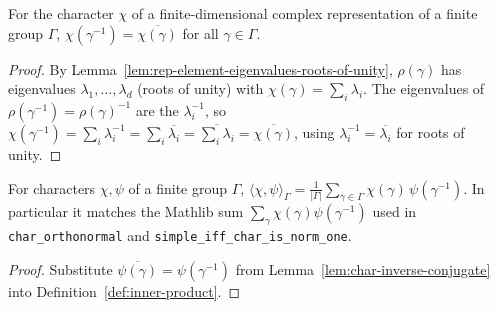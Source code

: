 \begin{lemma}
    \label{lem:char-inverse-conjugate}
    For the character $\chi$ of a finite-dimensional complex representation of a
    finite group $\Gamma$, $\chi(\gamma^{-1}) = \overline{\chi(\gamma)}$ for all
    $\gamma \in \Gamma$.
\end{lemma}
\begin{proof}
    By Lemma~\ref{lem:rep-element-eigenvalues-roots-of-unity},
    $\rho(\gamma)$ has eigenvalues $\lambda_1, \dots, \lambda_d$ (roots of unity)
    with $\chi(\gamma) = \sum_i \lambda_i$. The eigenvalues of
    $\rho(\gamma^{-1}) = \rho(\gamma)^{-1}$ are the $\lambda_i^{-1}$, so
    $\chi(\gamma^{-1}) = \sum_i \lambda_i^{-1} = \sum_i \overline{\lambda_i} =
    \overline{\sum_i \lambda_i} = \overline{\chi(\gamma)}$, using
    $\lambda_i^{-1} = \overline{\lambda_i}$ for roots of unity.
\end{proof}

\begin{lemma}
    \label{lem:inner-product-as-character-sum}
    For characters $\chi, \psi$ of a finite group $\Gamma$,
    $\langle \chi, \psi \rangle_\Gamma = \frac{1}{|\Gamma|}\sum_{\gamma \in
    \Gamma} \chi(\gamma)\,\psi(\gamma^{-1})$. In particular it matches the
    Mathlib sum $\sum_{\gamma} \chi(\gamma)\psi(\gamma^{-1})$ used in
    \texttt{char\_orthonormal} and \texttt{simple\_iff\_char\_is\_norm\_one}.
\end{lemma}
\begin{proof}
    Substitute $\overline{\psi(\gamma)} = \psi(\gamma^{-1})$ from
    Lemma~\ref{lem:char-inverse-conjugate} into
    Definition~\ref{def:inner-product}.
\end{proof}

